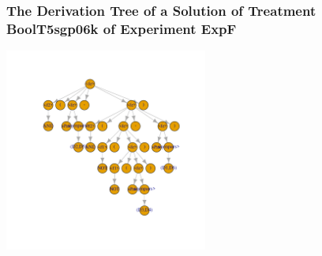  \begin{frame}
 \frametitle{ The Derivation Tree of a Solution of Treatment BoolT5sgp06k of Experiment ExpF }
 \begin{center}
\includegraphics[width=0.5\textwidth, angle=0]
{ExpFDerivationTreeFigure004.pdf}
 \end{center}
 \label{report/ExpFDerivationTreeFigure004.pdf}  
 \end{frame}


